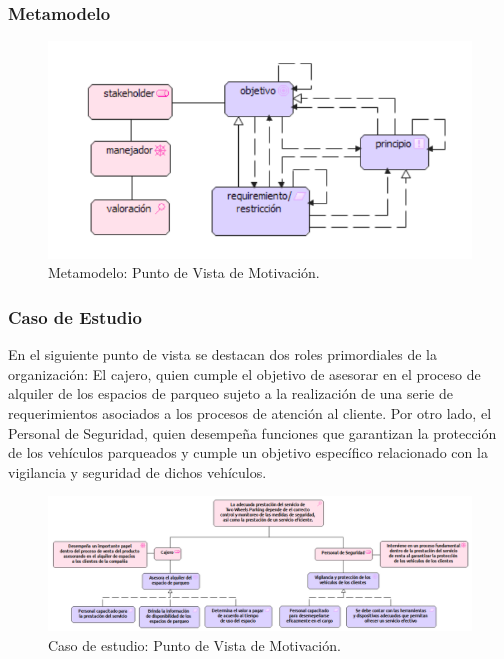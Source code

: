 \subsubsection{Metamodelo}
\begin{figure}[h]
	\centering
	\includegraphics[width=1.0\textwidth]{imagenes/Metamodelos/Motivacion/meta_Motivacion.pdf}
	\caption{Metamodelo: Punto de Vista de Motivación.}
	\label{fig:gap_analysis}
\end{figure}

\subsubsection{Caso de Estudio}
En el siguiente punto de vista se destacan dos roles primordiales de la organización: El cajero, quien cumple el objetivo de asesorar en el proceso de alquiler de los espacios de parqueo sujeto a la realización de una serie de requerimientos asociados a los procesos de atención al cliente. Por otro lado, el Personal de Seguridad, quien desempeña funciones que garantizan la protección de los vehículos parqueados y cumple un objetivo específico relacionado con la vigilancia y seguridad de dichos vehículos.

\begin{figure}[h]
	\centering
	\includegraphics[width=1.0\textwidth]{imagenes/Caso_Estudio/Motivacion/Motivacion.PDF}
	\caption{Caso de estudio: Punto de Vista de Motivación.}
	\label{fig:gap_analysis}
\end{figure}


